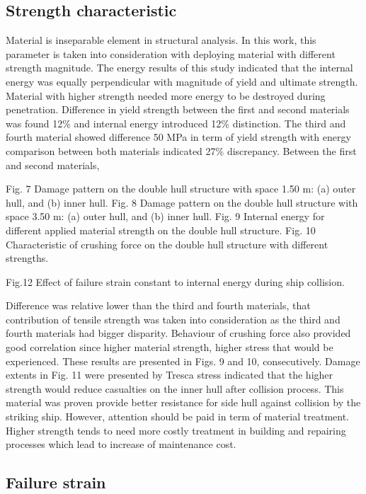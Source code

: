 \documentclass[10pt,journal]{IEEEtran}
\begin{document}
\subsection{Strength characteristic}

Material is inseparable element in structural analysis. In this work, this parameter is taken into consideration with deploying material with different strength magnitude. 
The energy results of this study indicated that the internal energy was equally perpendicular with magnitude of yield and ultimate strength. 
Material with higher strength needed more energy to be destroyed during penetration. Difference in yield strength between the first and second materials was found 12\% and internal energy introduced 12\% distinction. 
The third and fourth material showed difference 50 MPa in term of yield strength with energy comparison between both materials indicated 27\% discrepancy. Between the first and second materials, 

Fig. 7 Damage pattern on the double hull structure with space 1.50 m: (a) outer hull, and (b) inner hull. 
Fig. 8 Damage pattern on the double hull structure with space 3.50 m: (a) outer hull, and (b) inner hull. 
Fig. 9 Internal energy for different applied material strength on the double hull structure. 
Fig. 10 Characteristic of crushing force on the double hull structure with different strengths.


Fig.12 Effect of failure strain constant to internal energy during ship collision. 

Difference was relative lower than the third and fourth materials, that contribution of tensile strength was taken into consideration as the third and fourth materials had bigger disparity. 
Behaviour of crushing force also provided good correlation since higher material strength, higher stress that would be experienced. These results are presented in Figs. 9 and 10, consecutively. 
Damage extents in Fig. 11 were presented by Tresca stress indicated that the higher strength would reduce casualties on the inner hull after collision process. 
This material was proven provide better resistance for side hull against collision by the striking ship. However, attention should be paid in term of material treatment. 
Higher strength tends to need more costly treatment in building and repairing processes which lead to increase of maintenance cost. 

\subsection{Failure strain}
\end{document}
